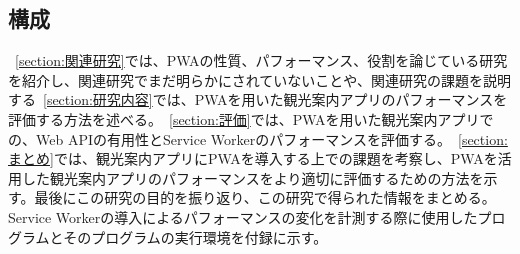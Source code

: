 \subsection{構成}
\label{subsection:構成}
~\autoref{section:関連研究}では、PWAの性質、パフォーマンス、役割を論じている研究を紹介し、関連研究でまだ明らかにされていないことや、関連研究の課題を説明する~\autoref{section:研究内容}では、PWAを用いた観光案内アプリのパフォーマンスを評価する方法を述べる。~\autoref{section:評価}では、PWAを用いた観光案内アプリでの、Web APIの有用性とService Workerのパフォーマンスを評価する。~\autoref{section:まとめ}では、観光案内アプリにPWAを導入する上での課題を考察し、PWAを活用した観光案内アプリのパフォーマンスをより適切に評価するための方法を示す。最後にこの研究の目的を振り返り、この研究で得られた情報をまとめる。Service Workerの導入によるパフォーマンスの変化を計測する際に使用したプログラムとそのプログラムの実行環境を付録に示す。